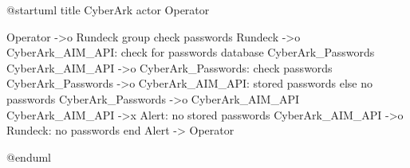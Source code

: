 @startuml
title CyberArk
actor Operator

Operator ->o Rundeck
group check passwords
  Rundeck ->o CyberArk_AIM_API: check for passwords
  database CyberArk_Passwords
  CyberArk_AIM_API ->o CyberArk_Passwords: check passwords
  CyberArk_Passwords ->o CyberArk_AIM_API: stored passwords
else no passwords
  CyberArk_Passwords ->o CyberArk_AIM_API
  CyberArk_AIM_API ->x Alert: no stored passwords
  CyberArk_AIM_API ->o Rundeck: no passwords
end
Alert -> Operator


@enduml
